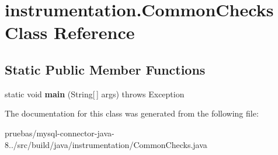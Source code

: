 \hypertarget{classinstrumentation_1_1_common_checks}{}\section{instrumentation.\+Common\+Checks Class Reference}
\label{classinstrumentation_1_1_common_checks}
\subsection*{Static Public Member Functions}
\begin{DoxyCompactItemize}
\item 
\mbox{\label{classinstrumentation_1_1_common_checks_a704e077cb361588f58eb3e04ada7f77f}} 
static void {\bfseries main} (String\mbox{[}$\,$\mbox{]} args)  throws Exception 
\end{DoxyCompactItemize}


The documentation for this class was generated from the following file\+:\begin{DoxyCompactItemize}
\item 
pruebas/mysql-\/connector-\/java-\/8../src/build/java/instrumentation/Common\+Checks.\+java\end{DoxyCompactItemize}
